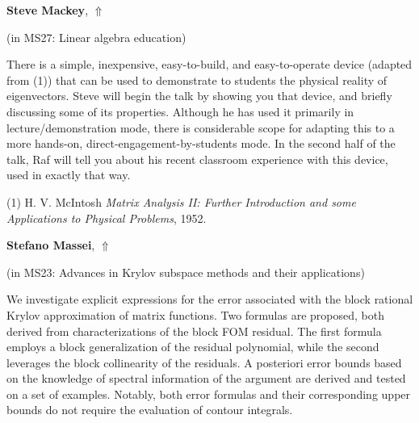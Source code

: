 \documentclass[ILAS2025-program.tex]{subfiles}
\begin{document}
     \hypertarget{down0294}{}\begin{ilasabstract}
    
    \textbf{Steve Mackey},  \hfill \hyperlink{up0294}{$\Uparrow$}
    
    (in {\color{mstitle}MS27: Linear algebra education})
        
        \mtskip
    There is a simple, inexpensive, easy-to-build, and easy-to-operate device 
(adapted from (1)) 
that can be used to demonstrate to students the physical reality of eigenvectors.
Steve will begin the talk by showing you that device, 
and briefly discussing some of its properties.
Although he has used it primarily in lecture/demonstration mode, 
there is considerable scope for adapting this 
to a more hands-on, direct-engagement-by-students mode.  
In the second half of the talk, 
Raf will tell you about his recent classroom experience
with this device, used in exactly that way.

(1) {H. V. McIntosh} 
{\em Matrix Analysis II: Further Introduction and some Applications to Physical Problems},  
1952.
\end{ilasabstract}
     \hypertarget{down0193}{}\begin{ilasabstract}
    
    \textbf{Stefano Massei},  \hfill \hyperlink{up0193}{$\Uparrow$}
    
    (in {\color{mstitle}MS23: Advances in Krylov subspace methods and their applications})
        
        \mtskip
    We investigate explicit expressions for the error associated with the block rational Krylov approximation of matrix functions. Two formulas are proposed, both derived from  characterizations of the block FOM residual. The first formula employs a block generalization of the residual polynomial, while the second leverages the block collinearity of the residuals. A posteriori error bounds based on the knowledge 
of spectral information of the argument are derived and tested on a set of examples. Notably, both error formulas and their corresponding upper bounds do not require the evaluation of contour integrals.  
\end{ilasabstract}
\end{document}

